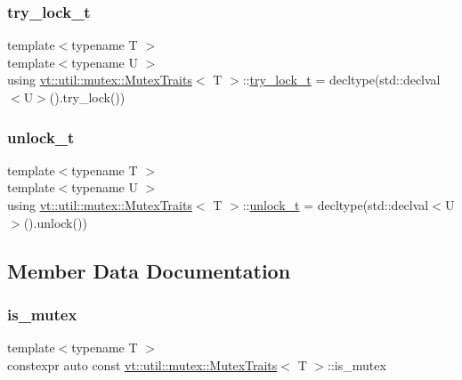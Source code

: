 \subsubsection{\texorpdfstring{try\+\_\+lock\+\_\+t}{try\_lock\_t}}
{\footnotesize\ttfamily template$<$typename T $>$ \\
template$<$typename U $>$ \\
using \hyperlink{structvt_1_1util_1_1mutex_1_1_mutex_traits}{vt\+::util\+::mutex\+::\+Mutex\+Traits}$<$ T $>$\+::\hyperlink{structvt_1_1util_1_1mutex_1_1_mutex_traits_a444680f011349740337d02124ac0bdea}{try\+\_\+lock\+\_\+t} =  decltype(std\+::declval$<$U$>$().try\+\_\+lock())}

\mbox{\label{structvt_1_1util_1_1mutex_1_1_mutex_traits_a85a0412ba9bfe2c48ee8bd27096050e6}} 
\subsubsection{\texorpdfstring{unlock\+\_\+t}{unlock\_t}}
{\footnotesize\ttfamily template$<$typename T $>$ \\
template$<$typename U $>$ \\
using \hyperlink{structvt_1_1util_1_1mutex_1_1_mutex_traits}{vt\+::util\+::mutex\+::\+Mutex\+Traits}$<$ T $>$\+::\hyperlink{structvt_1_1util_1_1mutex_1_1_mutex_traits_a85a0412ba9bfe2c48ee8bd27096050e6}{unlock\+\_\+t} =  decltype(std\+::declval$<$U$>$().unlock())}



\subsection{Member Data Documentation}
\mbox{\label{structvt_1_1util_1_1mutex_1_1_mutex_traits_ac5087e94d2ca61e0cd4049f8c82ff009}} 
\subsubsection{\texorpdfstring{is\+\_\+mutex}{is\_mutex}}
{\footnotesize\ttfamily template$<$typename T $>$ \\
constexpr auto const \hyperlink{structvt_1_1util_1_1mutex_1_1_mutex_traits}{vt\+::util\+::mutex\+::\+Mutex\+Traits}$<$ T $>$\+::is\+\_\+mutex\hspace{0.3cm}{\ttfamily [static]}}

